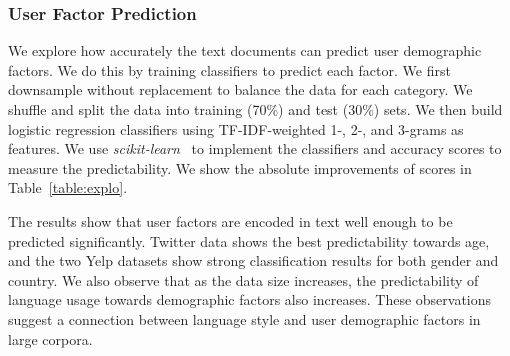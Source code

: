 
\subsubsection{User Factor Prediction}

We explore how accurately the text documents can predict user demographic factors. 
We do this by training classifiers to predict each factor.
We first downsample without replacement to balance the data for each category. We shuffle and split the data into training (70\%) and test (30\%) sets. 
We then build logistic regression classifiers using TF-IDF-weighted 1-, 2-, and 3-grams as features. 
We use \textit{scikit-learn}~\cite{pedregosa2011scikit} to implement the classifiers and accuracy scores to measure the predictability.
We show the absolute improvements of scores in Table~\ref{table:explo}. 

The results show that user factors are encoded in text
well enough to be predicted significantly.
Twitter data shows the best predictability towards age, and the two Yelp datasets show strong classification results for both gender and country. We also observe that as the data size increases, the predictability of language usage towards demographic factors also increases. These observations suggest a connection between language style and user demographic factors in large corpora.

